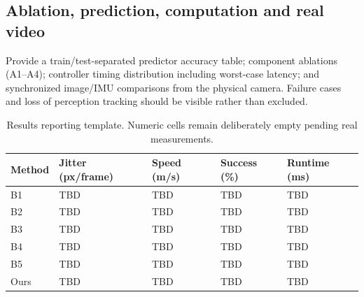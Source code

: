 \subsection{Ablation, prediction, computation and real video}
Provide a train/test-separated predictor accuracy table; component ablations (A1--A4); controller timing distribution including worst-case latency; and synchronized image/IMU comparisons from the physical camera. Failure cases and loss of perception tracking should be visible rather than excluded.
\begin{table}[ht]\centering\small
\caption{Results reporting template. Numeric cells remain deliberately empty pending real measurements.}
\begin{tabular}{@{}lllll@{}}\toprule Method & Jitter (px/frame) & Speed (m/s) & Success (\%) & Runtime (ms)\\\midrule
B1 & TBD & TBD & TBD & TBD\\
B2 & TBD & TBD & TBD & TBD\\
B3 & TBD & TBD & TBD & TBD\\
B4 & TBD & TBD & TBD & TBD\\
B5 & TBD & TBD & TBD & TBD\\
Ours & TBD & TBD & TBD & TBD\\\bottomrule
\end{tabular}\label{tab:resultplaceholder}\end{table}
